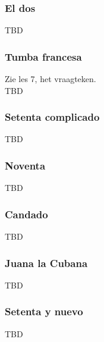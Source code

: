 \subsubsection{El dos}
TBD

\subsubsection{Tumba francesa}
Zie les 7, het vraagteken.\\
TBD

\subsubsection{Setenta complicado}
TBD

\subsubsection{Noventa}
TBD

\subsubsection{Candado}
TBD

\subsubsection{Juana la Cubana}
TBD

\subsubsection{Setenta y nuevo}
TBD

